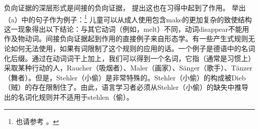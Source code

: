 负向证据的深层形式是间接的负向证据， \citet[]{Chomsky81a}提出这也在习得中起到了作用。 \citet[\S~5.2]{Goldberg95a}举出（a）中的句子作为例子：\footnote{%
也请参考 。
}
\eal
{}
\zl
儿童可以从成人使用包含make的更加复杂的致使结构这一现象得出以下结论：与其它动词（例如，melt）不同，动词disappear不能用作及物动词。间接负向证据起到作用的直接例子来自形态学。有一些产生式规则无论如何无法使用，如果有词限制了这个规则的应用的话。一个例子是德语中的名词化后缀。通过在动词词干上加上，我们可以得到一个名词，它指（通常是习惯上）采取某种行动的人，Raucher（吸烟者）、Maler（画家）、Sänger（歌手）、Tänzer（舞者）。但是，Stehler（小偷）是非常特殊的。Stehler（小偷）的构成被Dieb（贼）的存在限制住了。由此，语言学习者必须从Stehler（小偷）的缺失中推导出的名词化规则并不适用于stehlen（偷）。

